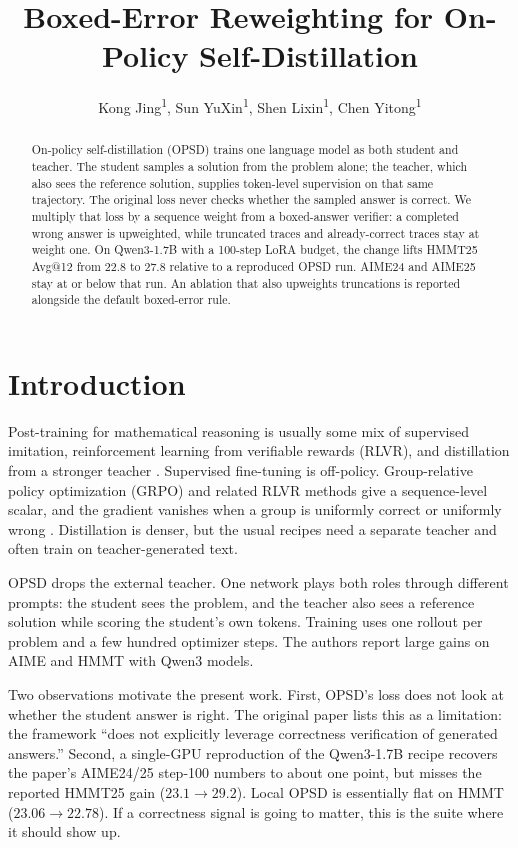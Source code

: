\documentclass[letterpaper]{article}
\title{Boxed-Error Reweighting for On-Policy Self-Distillation}
\author{
Kong Jing\textsuperscript{\rm 1}\equalcontrib,
Sun YuXin\textsuperscript{\rm 1}\equalcontrib,
Shen Lixin\textsuperscript{\rm 1}\equalcontrib,
Chen Yitong\textsuperscript{\rm 1}\equalcontrib
}
\begin{document}
\maketitle

\begin{abstract}
On-policy self-distillation (OPSD) trains one language model as both student and teacher. The student samples a solution from the problem alone; the teacher, which also sees the reference solution, supplies token-level supervision on that same trajectory. The original loss never checks whether the sampled answer is correct. We multiply that loss by a sequence weight from a boxed-answer verifier: a completed wrong answer is upweighted, while truncated traces and already-correct traces stay at weight one. On Qwen3-1.7B with a 100-step LoRA budget, the change lifts HMMT25 Avg@12 from 22.8 to 27.8 relative to a reproduced OPSD run. AIME24 and AIME25 stay at or below that run. An ablation that also upweights truncations is reported alongside the default boxed-error rule.
\end{abstract}

\section{Introduction}

Post-training for mathematical reasoning is usually some mix of supervised imitation, reinforcement learning from verifiable rewards (RLVR), and distillation from a stronger teacher \cite{hinton2015distilling,ouyang2022instructgpt,shao2024deepseekmath,agarwal2024gkd}. Supervised fine-tuning is off-policy. Group-relative policy optimization (GRPO) and related RLVR methods give a sequence-level scalar, and the gradient vanishes when a group is uniformly correct or uniformly wrong \cite{shao2024deepseekmath,deepseekai2025r1}. Distillation is denser, but the usual recipes need a separate teacher and often train on teacher-generated text.

OPSD \cite{zhao2026opsd} drops the external teacher. One network plays both roles through different prompts: the student sees the problem, and the teacher also sees a reference solution while scoring the student's own tokens. Training uses one rollout per problem and a few hundred optimizer steps. The authors report large gains on AIME and HMMT with Qwen3 models.

Two observations motivate the present work. First, OPSD's loss does not look at whether the student answer is right. The original paper lists this as a limitation: the framework ``does not explicitly leverage correctness verification of generated answers.'' Second, a single-GPU reproduction of the Qwen3-1.7B recipe recovers the paper's AIME24/25 step-100 numbers to about one point, but misses the reported HMMT25 gain ($23.1 \rightarrow 29.2$). Local OPSD is essentially flat on HMMT ($23.06 \rightarrow 22.78$). If a correctness signal is going to matter, this is the suite where it should show up.
\end{document}
